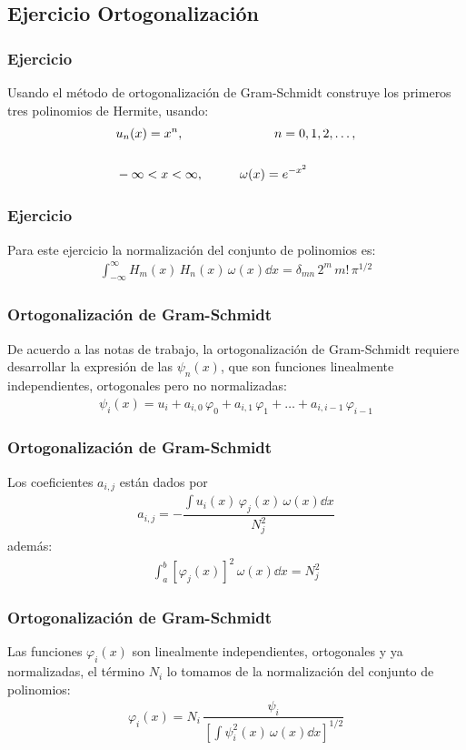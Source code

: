 \subsection{Ejercicio Ortogonalización}
\begin{frame}
\frametitle{Ejercicio}
Usando el método de ortogonalización de Gram-Schmidt construye los primeros tres polinomios de Hermite, usando:
\begin{align*}
&u_{n}(x) = x^{n}, \hspace{2.5cm} n = 0, 1, 2, \ldots, \\[0.5cm]
&-\infty < x < \infty, \hspace{1cm} \omega(x) = e^{-x^{2}}
\end{align*}
\end{frame}
\begin{frame}
\frametitle{Ejercicio}
Para este ejercicio la normalización del conjunto de polinomios es:
\begin{align*}
\int_{-\infty}^{\infty} H_{m} (x) \, H_{n} (x) \, \omega (x) \dd{x} = \delta_{mn} \, 2^{m} \, m! \, \pi^{1/2}
\end{align*}
\end{frame}
\begin{frame}
\frametitle{Ortogonalización de Gram-Schmidt}
De acuerdo a las notas de trabajo, la ortogonalización de Gram-Schmidt requiere desarrollar la expresión de las $\psi_{n} (x)$, que son funciones linealmente independientes, ortogonales pero no normalizadas:
\begin{align*}
\psi_{i} (x) = u_{i} + a_{i,0} \, \varphi_{0} + a_{i,1} \, \varphi_{1} + \ldots + a_{i,i-1} \, \varphi_{i-1} 
\end{align*}
\end{frame}
\begin{frame}
\frametitle{Ortogonalización de Gram-Schmidt}
Los coeficientes $a_{i, j}$ están dados por
\begin{align*}
a_{i,j} = - \dfrac{\displaystyle \int u_{i}(x) \, \varphi_{j} (x) \, \omega (x) \dd{x}}{N_{j}^{2}}
\end{align*}
además:
\begin{align*}
\int_{a}^{b} \left[ \varphi_{j} (x) \right]^{2} \, \omega (x) \dd{x} = N_{j}^{2}
\end{align*}
\end{frame}
\begin{frame}
\frametitle{Ortogonalización de Gram-Schmidt}
Las funciones $\varphi_{i}(x)$ son linealmente independientes, ortogonales y ya normalizadas, el término $N_{i}$ lo tomamos de la normalización del conjunto de polinomios:
\begin{align*}
\varphi_{i} (x) = N_{i} \, \dfrac{\psi_{i}}{\left[ \displaystyle \int \psi_{i}^{2} (x) \, \omega (x) \dd{x} \right]^{1/2}}
\end{align*}
\end{frame}
